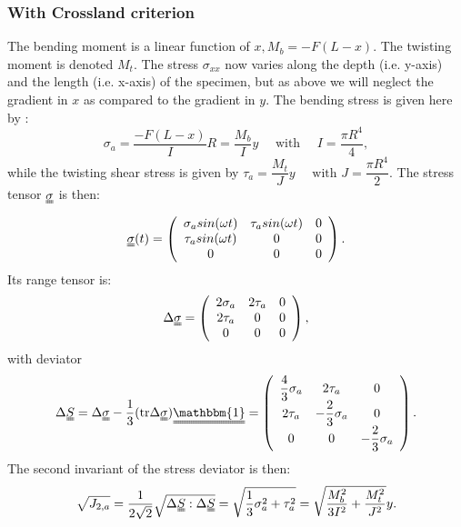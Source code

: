 \subsubsection{With Crossland criterion}
The bending moment is a linear function of $x, M_b= -F(L-x)$. The twisting moment is denoted $M_t$. The stress $\sigma_{xx}$ now varies along the depth (i.e. y-axis) and the length (i.e. x-axis) of the specimen, but as above we will neglect the gradient in $x$ as compared to the gradient in $y$. The bending stress is given here by : 
\begin{equation}
	\sigma_{a}=\dfrac{-F(L-x)}{I}R=\dfrac{M_b}{I}y \quad \text{ with } \quad I=\dfrac{\pi R^4}{4},
\end{equation}
while the twisting shear stress is given by 
$ \tau_{a}=\dfrac{M_t}{J}y \quad \text{ with  }
J=\dfrac{\pi R^4}{2}$. 
The stress tensor $\uuline{\sigma}$ is then:
\begin{equation} 
	\uuline{\sigma}(t)=
	\left(
	\begin{array}{ccc}
		\sigma_{a}sin(\omega t) & \tau_asin(\omega t) & 0\\
		\tau_asin(\omega t) & 0 & 0\\ 
		0 & 0 & 0\\
	\end{array}\right) .
\end{equation}
Its range tensor is:
\begin{equation} 
	\Delta\uuline{\sigma}=
	\left(
	\begin{array}{ccc}
		2\sigma_a& 2\tau_a & 0\\
		2\tau_a& 0 & 0\\ 
		0 & 0 & 0\\
	\end{array}\right) ,
\end{equation}
with deviator
\begin{equation} 
	\Delta\uuline{ S}=\Delta\uuline{\sigma}-\dfrac{1}{3}(\textrm{tr}\Delta\uuline{\sigma})\uuline{\mathbbm{1}}=
	\left(
	\begin{array}{ccc}
		\dfrac{4}{3}\sigma_{a} & 2\tau_a & 0\\
		2\tau_a & -\dfrac{2}{3}\sigma_a & 0\\ 
		0 & 0 & -\dfrac{2}{3}\sigma_a\\
	\end{array}\right) .
\end{equation}
The second invariant of the stress deviator is then:
\begin{equation}
	\sqrt{J_{2,a}}=\dfrac{1}{2\sqrt{2}}\sqrt{\Delta \uuline{S}:\Delta \uuline{S}}=\sqrt{\dfrac{1}{3}\sigma_a^2+\tau_a^2}=\sqrt{\dfrac{M_b^2}{3I^2}+\dfrac{M_t^2}{J^2}}y.
\end{equation}
